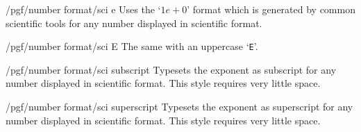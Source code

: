 \begin{key}{/pgf/number format/sci e}
  Uses the `$1e{+}0$' format which is generated by common scientific
  tools for any number displayed in scientific format. 

\begin{codeexample}[]
\end{codeexample}
\end{key}

\begin{key}{/pgf/number format/sci E}
  The same with an uppercase `\texttt{E}'.

\begin{codeexample}[]
\end{codeexample}
\end{key}

\begin{key}{/pgf/number format/sci subscript}
  Typesets the exponent as subscript for any number displayed in
  scientific format. This style requires very little space. 

\begin{codeexample}[]
\end{codeexample}
\end{key}

\begin{key}{/pgf/number format/sci superscript}
  Typesets the exponent as superscript for any number displayed in
  scientific format. This style requires very little space. 

\begin{codeexample}[]
\end{codeexample}
\end{key}

